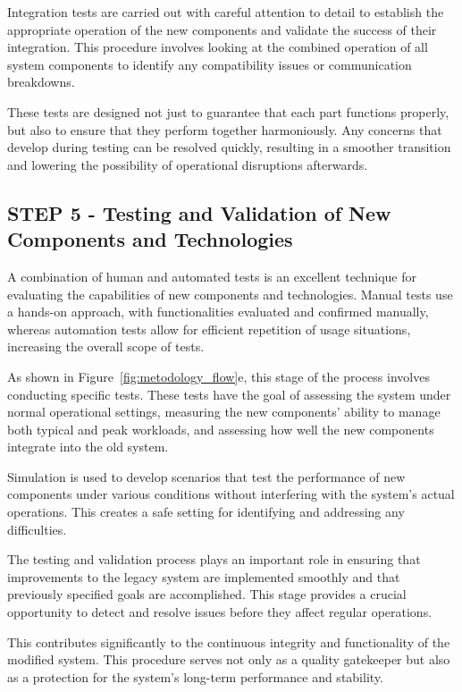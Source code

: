 \documentclass[journal]{IEEEtran}
\begin{document}
Integration tests are carried out with careful attention to detail to establish the appropriate operation of the new components and validate the success of their integration. This procedure involves looking at the combined operation of all system components to identify any compatibility issues or communication breakdowns.

These tests are designed not just to guarantee that each part functions properly, but also to ensure that they perform together harmoniously. Any concerns that develop during testing can be resolved quickly, resulting in a smoother transition and lowering the possibility of operational disruptions afterwards.

\subsection{STEP 5 - Testing and Validation of New Components and Technologies}

A combination of human and automated tests is an excellent technique for evaluating the capabilities of new components and technologies. Manual tests use a hands-on approach, with functionalities evaluated and confirmed manually, whereas automation tests allow for efficient repetition of usage situations, increasing the overall scope of tests.

As shown in Figure~\ref{fig:metodology_flow}e, this stage of the process involves conducting specific tests. These tests have the goal of assessing the system under normal operational settings, measuring the new components' ability to manage both typical and peak workloads, and assessing how well the new components integrate into the old system.

Simulation is used to develop scenarios that test the performance of new components under various conditions without interfering with the system's actual operations. This creates a safe setting for identifying and addressing any difficulties.

The testing and validation process plays an important role in ensuring that improvements to the legacy system are implemented smoothly and that previously specified goals are accomplished. This stage provides a crucial opportunity to detect and resolve issues before they affect regular operations.

This contributes significantly to the continuous integrity and functionality of the modified system. This procedure serves not only as a quality gatekeeper but also as a protection for the system's long-term performance and stability.
\end{document}
